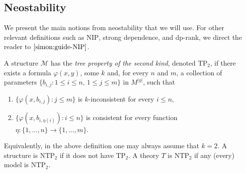 \documentclass[12pt]{article}
\newcommand{\Mm}{\mathcal{M}}
\newcommand{\NIP}{\ensuremath{\mathrm{NIP}}}
\newcommand{\NTP}{\ensuremath{\mathrm{NTP}_2}}
\newcommand{\TP}{\ensuremath{\mathrm{TP}_2}}
\theoremstyle{definition}
\theoremstyle{remark}
\begin{document}
\subsection{Neostability}

We present the main notions from neostability that we will use. For other relevant definitions such as $\NIP$, strong dependence, and dp-rank, we direct the reader to $\cite{simon:guide-NIP}$.

A structure $\Mm$ has the \emph{tree property of the second kind}, denoted \emph{$\TP$}, if there exists a formula $\varphi(x, y)$, some $k$ and, for every $n$ and $m$, a collection of parameters \mbox{$\{b_{i,j} : 1\leq i\leq n, \, 1\leq j \leq m\}$} in $M^{|y|}$, such that
\begin{enumerate}[(1)]
    \item $\{\varphi(x , b_{i,j}) : j \leq m\}$ is $k$-inconsistent for every $i\leq n$,
    \item $\{\varphi(x , b_{i,\eta(i)}) : i\leq n\}$ is consistent for every function $\eta : \{1,\ldots, n\} \rightarrow \{1,\ldots, m\}$.
\end{enumerate}
Equivalently, in the above definition one may always assume that $k=2$.
A structure is $\NTP$ if it does not have $\TP$. A theory $T$ is $\NTP$ if any (every) model is $\NTP$. 

\end{document}
